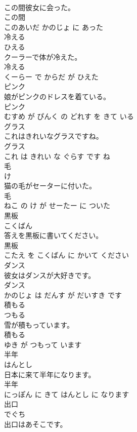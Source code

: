 \documentclass[8pt]{extreport}
\begin{document}
\begin{CJK}{UTF8}{min}
\\	この間彼女に会った。	
\\	この間 
\\	このあいだ かのじょ に あった			
\\	冷える	
\\	ひえる			
\\	クーラーで体が冷えた。	
\\	冷える 
\\	くーらー で からだ が ひえた			
\\	ピンク	
\\	娘がピンクのドレスを着ている。	
\\	ピンク 
\\	むすめ が ぴんく の どれす を きて いる			
\\	グラス	
\\	これはきれいなグラスですね。	
\\	グラス 
\\	これ は きれい な ぐらす です ね			
\\	毛	
\\	け			
\\	猫の毛がセーターに付いた。	
\\	毛 
\\	ねこ の け が せーたー に ついた			
\\	黒板	
\\	こくばん			
\\	答えを黒板に書いてください。	
\\	黒板 
\\	こたえ を こくばん に かいて ください			
\\	ダンス	
\\	彼女はダンスが大好きです。	
\\	ダンス 
\\	かのじょ は だんす が だいすき です			
\\	積もる	
\\	つもる			
\\	雪が積もっています。	
\\	積もる 
\\	ゆき が つもって います			
\\	半年	
\\	はんとし			
\\	日本に来て半年になります。	
\\	半年 
\\	にっぽん に きて はんとし に なります			
\\	出口	
\\	でぐち			
\\	出口はあそこです。	

\end{CJK}
\end{document}
